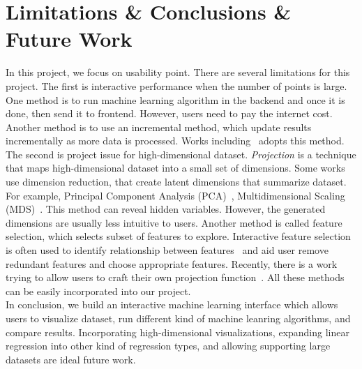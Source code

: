 \documentclass{article}
\begin{document}
\section{Limitations \& Conclusions \& Future Work}
In this project, we focus on usability point. There are several limitations for this project. The first is interactive performance when the number of points is large. One method is to run machine learning algorithm in the backend and once it is done, then send it to frontend.  However, users need to pay the internet cost.  Another method is to use an incremental method, which update results incrementally as more data is processed. Works including~\cite{crotty2015vizdom} adopts this method. \\
The second is project issue for high-dimensional dataset. \emph{Projection} is a technique that maps high-dimensional dataset into a small set of dimensions. Some works use dimension reduction, that create latent dimensions that summarize dataset. For example, Principal Component Analysis (PCA)~\cite{jolliffe2002principal}, Multidimensional Scaling (MDS)~\cite{mead1992review}. This method can reveal hidden variables. However, the generated dimensions are usually less intuitive to users. Another method is called feature selection, which selects subset of features to explore. Interactive feature selection is often used to identify relationship between features~\cite{guo2003coordinating, yang2004value} and aid user remove redundant features and choose appropriate features. Recently, there is a work trying to allow users to craft their own projection function~\cite{gleicher2013explainers}.  All these methods can be easily incorporated into our project.  \\
In conclusion, we build an interactive machine learning interface which allows users to visualize dataset, run different kind of machine leanring algorithms, and compare results. Incorporating high-dimensional visualizations, expanding linear regression into other kind of regression types, and allowing supporting large datasets are ideal future work.

\small


\end{document}
